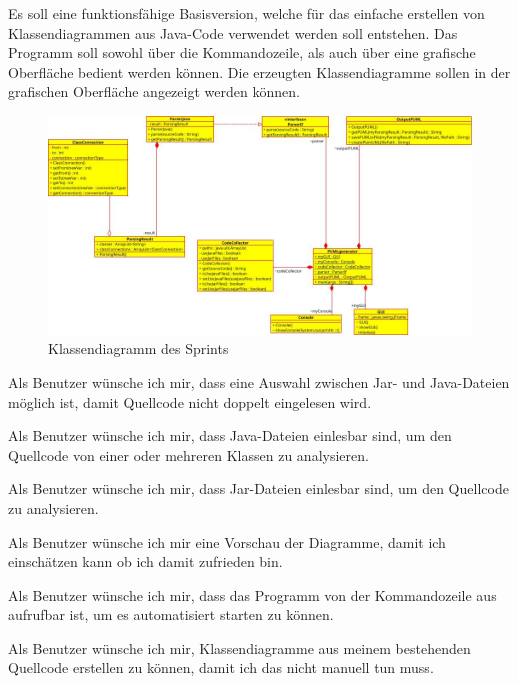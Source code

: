 
Es soll eine funktionsfähige Basisversion, welche für das einfache erstellen von Klassendiagrammen aus Java-Code verwendet werden soll entstehen. Das Programm soll sowohl über die Kommandozeile, als auch über eine grafische Oberfläche bedient werden können. Die erzeugten Klassendiagramme sollen in der grafischen Oberfläche angezeigt werden können.

\begin{figure}[hbtp]
\centering
\includegraphics[scale=0.5]{Bilder/classDiagrammSprint1}
\caption{Klassendiagramm des Sprints}
\end{figure}
\nsecend

Als Benutzer wünsche ich mir, dass eine Auswahl zwischen Jar- und Java-Dateien möglich ist, damit Quellcode nicht doppelt eingelesen wird.
\nsecend

Als Benutzer wünsche ich mir, dass Java-Dateien einlesbar sind, um den Quellcode von einer oder mehreren Klassen zu analysieren.
\nsecend

Als Benutzer wünsche ich mir, dass Jar-Dateien einlesbar sind, um den Quellcode zu analysieren.
\nsecend
\nsecend

Als Benutzer wünsche ich mir eine Vorschau der Diagramme, damit ich einschätzen kann ob ich damit zufrieden bin.
\nsecend

Als Benutzer wünsche ich mir, dass das Programm von der Kommandozeile aus aufrufbar ist, um es automatisiert starten zu können.
\nsecend

Als Benutzer wünsche ich mir, Klassendiagramme aus meinem bestehenden Quellcode erstellen zu können, damit ich das nicht manuell tun muss.
\nsecend

